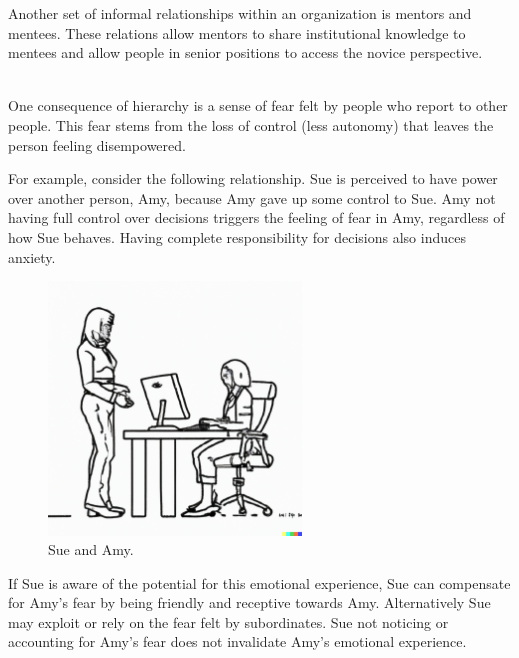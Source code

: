 Another set of informal relationships within an organization is mentors and mentees. These relations allow mentors to share institutional knowledge to mentees and allow people in senior positions to access the novice perspective. 


\ \\

One consequence of hierarchy is a sense of fear felt by people who report to other people. This fear stems from the loss of control (less autonomy) that leaves the person feeling disempowered. 

For example, consider the following relationship. Sue is perceived to have power over another person, Amy, because Amy gave up some control to Sue. Amy not having full control over decisions triggers the feeling of fear in Amy, regardless of how Sue behaves. Having complete responsibility for decisions also induces anxiety.

\begin{figure}[H]
    \centering
\includegraphics[width=0.6\textwidth]{images/female_supervisor_standing_while_talking_to_seated_female_employee_typing_on_keyboard.pdf}
    \caption{Sue and Amy.}
    \label{fig:subordinate_and_supervisor}
\end{figure}



If Sue is aware of the potential for this emotional experience, Sue can compensate for Amy's fear by being friendly and receptive towards Amy. Alternatively Sue may exploit or rely on the fear felt by subordinates. Sue not noticing or accounting for Amy's fear does not invalidate Amy's emotional experience.





